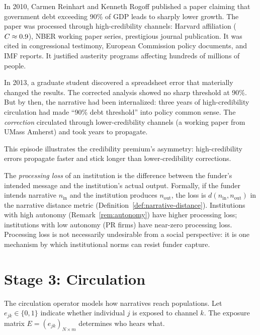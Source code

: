 \begin{example}
\label{ex:credibility-practice}
In 2010, Carmen Reinhart and Kenneth Rogoff published a paper claiming that government debt exceeding 90\% of GDP leads to sharply lower growth.
The paper was processed through high-credibility channels: Harvard affiliation ($C_{} \approx 0.9$), NBER working paper series, prestigious journal publication.
It was cited in congressional testimony, European Commission policy documents, and IMF reports.
It justified austerity programs affecting hundreds of millions of people.

In 2013, a graduate student discovered a spreadsheet error that materially changed the results.
The corrected analysis showed no sharp threshold at 90\%.
But by then, the narrative had been internalized: three years of high-credibility circulation had made ``90\% debt threshold'' into policy common sense.
The \emph{correction} circulated through lower-credibility channels (a working paper from UMass Amherst) and took years to propagate.

This episode illustrates the credibility premium's asymmetry: high-credibility errors propagate faster and stick longer than lower-credibility corrections.
\end{example}

\begin{definition}
\label{def:processing-loss}
The \emph{processing loss} of an institution is the difference between the funder's intended message and the institution's actual output.
Formally, if the funder intends narrative $n_{\text{in}}$ and the institution produces $n_{\text{out}}$, the loss is $d(n_{\text{in}}, n_{\text{out}})$ in the narrative distance metric (Definition~\ref{def:narrative-distance}).
Institutions with high autonomy (Remark~\ref{rem:autonomy}) have higher processing loss; institutions with low autonomy (PR firms) have near-zero processing loss.
Processing loss is not necessarily undesirable from a social perspective: it is one mechanism by which institutional norms can resist funder capture.
\end{definition}


\section{Stage 3: Circulation}
\label{sec:ch5-circulation}

The circulation operator models how narratives reach populations.
Let $e_{jk} \in \{0,1\}$ indicate whether individual $j$ is exposed to channel $k$.
The exposure matrix $E = (e_{jk})_{N \times m}$ determines who hears what.

